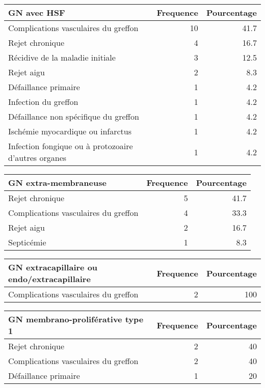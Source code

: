 \documentclass[11pt,a4paper]{article}\usepackage[]{graphicx}\usepackage[]{color}
\begin{document}
\begin{table}[H]
\centering
\begin{tabular}{lrr}
  \hline
GN avec HSF & Frequence & Pourcentage \\ 
  \hline
Complications vasculaires du greffon & 10 & 41.7 \\ 
  Rejet chronique & 4 & 16.7 \\ 
  Récidive de la maladie initiale & 3 & 12.5 \\ 
  Rejet aigu & 2 & 8.3 \\ 
  Défaillance primaire & 1 & 4.2 \\ 
  Infection du greffon & 1 & 4.2 \\ 
  Défaillance non spécifique du greffon & 1 & 4.2 \\ 
  Ischémie myocardique ou infarctus & 1 & 4.2 \\ 
  Infection fongique ou à protozoaire d'autres organes & 1 & 4.2 \\ 
   \hline
\end{tabular}
\end{table}
\begin{table}[H]
\centering
\begin{tabular}{lrr}
  \hline
GN extra-membraneuse & Frequence & Pourcentage \\ 
  \hline
Rejet chronique & 5 & 41.7 \\ 
  Complications vasculaires du greffon & 4 & 33.3 \\ 
  Rejet aigu & 2 & 16.7 \\ 
  Septicémie & 1 & 8.3 \\ 
   \hline
\end{tabular}
\end{table}
\begin{table}[H]
\centering
\begin{tabular}{lrr}
  \hline
GN extracapillaire ou endo/extracapillaire & Frequence & Pourcentage \\ 
  \hline
Complications vasculaires du greffon & 2 & 100 \\ 
   \hline
\end{tabular}
\end{table}
\begin{table}[H]
\centering
\begin{tabular}{lrr}
  \hline
GN membrano-proliférative type 1 & Frequence & Pourcentage \\ 
  \hline
Rejet chronique & 2 & 40 \\ 
  Complications vasculaires du greffon & 2 & 40 \\ 
  Défaillance primaire & 1 & 20 \\ 
   \hline
\end{tabular}
\end{table}
\end{document}
